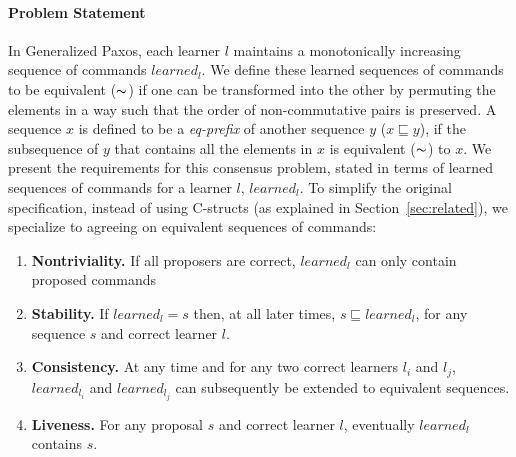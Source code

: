\paragraph*{Problem Statement}
In Generalized Paxos, each learner $l$ maintains a monotonically increasing sequence of commands $learned_l$. 
We define these learned sequences of commands to be equivalent ($\thicksim$) 
if one can be transformed into the other by permuting the elements in a way such that the order of non-commutative pairs is preserved. A sequence $x$ is defined to be a \textit{eq-prefix} of another sequence $y$ ($x \sqsubseteq y$), if the subsequence of $y$ that contains all the elements in $x$ is equivalent ($\thicksim$) to $x$. 
We present the requirements for this consensus problem, stated in terms of learned sequences of commands for a learner $l$, $learned_l$. 
To simplify the original specification, instead of using C-structs (as explained in Section~\ref{sec:related}), we specialize to agreeing on equivalent sequences of commands:\par
%
\begin{enumerate}
\item \textbf{Nontriviality.} If all proposers are correct, $learned_l$ can only contain proposed commands
\item \textbf{Stability.} If $learned_l = s$ then, at all later times, $s \sqsubseteq learned_l$, for any sequence $s$ and correct learner $l$.
\item \textbf{Consistency.} At any time and for any two correct learners $l_i$ and $l_j$, $learned_{l_i}$ and $learned_{l_j}$ 
can subsequently be extended to equivalent sequences.
\item \textbf{Liveness.} For any proposal $s$ and correct learner $l$, eventually $learned_l$ contains $s$.
\end{enumerate}